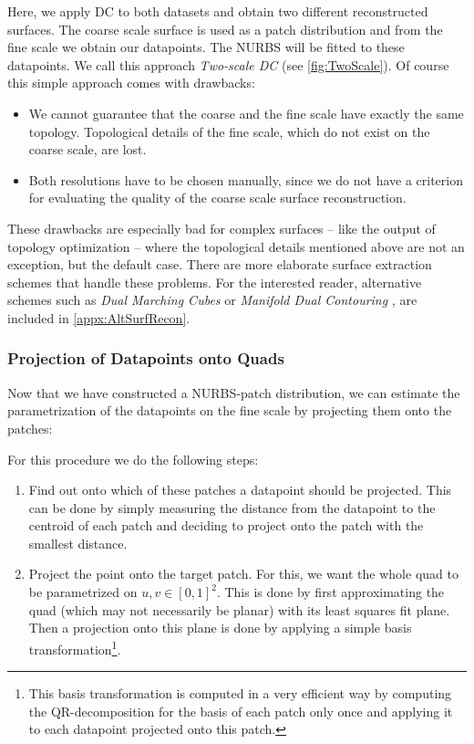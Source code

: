Here, we apply \ac{DC} to both datasets and obtain two different reconstructed surfaces.
The coarse scale surface is used as a patch distribution and from the fine scale we obtain our datapoints. The \ac{NURBS} will be fitted to these datapoints. We call this approach \emph{Two-scale \acl{DC}} (see \autoref{fig:TwoScale}).
Of course this simple approach comes with drawbacks:
\begin{itemize}
\item We cannot guarantee that the coarse and the fine scale have exactly the same topology. Topological details of the fine scale, which do not exist on the coarse scale, are lost.
\item Both resolutions have to be chosen manually, since we do not have a criterion for evaluating the quality of the coarse scale surface reconstruction.
\end{itemize}
These drawbacks are especially bad for complex surfaces -- like the output of topology optimization -- where the topological details mentioned above are not an exception, but the default case. There are more elaborate surface extraction schemes that handle these problems. For the interested reader, alternative schemes such as \emph{Dual Marching Cubes} \cite{ScottSchaefer2004} or \emph{Manifold Dual Contouring} \cite{Schaefer2007}, are included in \autoref{appx:AltSurfRecon}.
\subsubsection{Projection of Datapoints onto Quads}
Now that we have constructed a \ac{NURBS}-patch distribution, we can estimate the parametrization of the datapoints on the fine scale by projecting them onto the patches: 

For this procedure we do the following steps:

\begin{enumerate}
\item Find out onto which of these patches a datapoint should be projected. This can be done by simply measuring the distance from the datapoint to the centroid of each patch and deciding to project onto the patch with the smallest distance.
\item Project the point onto the target patch. For this, we want the whole \ac{quad} to be parametrized on $u,v\in\left[0,1\right]^2$. This is done by first approximating the quad (which may not necessarily be planar) with its least squares fit plane. Then a projection onto this plane is done by applying a simple basis transformation\footnote{This basis transformation is computed in a very efficient way by computing the QR-decomposition for the basis of each patch only once and applying it to each datapoint projected onto this patch.}.
\end{enumerate}

